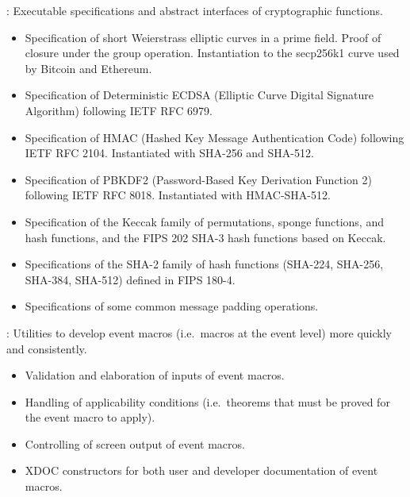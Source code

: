
\begin{frame}

\newlibtitle

:
Executable specifications and abstract interfaces of cryptographic functions.
\begin{itemize}
\item
Specification of short Weierstrass elliptic curves in a prime field.
Proof of closure under the group operation.
Instantiation to the secp256k1 curve used by Bitcoin and Ethereum.
\item
Specification of Deterministic ECDSA
(Elliptic Curve Digital Signature Algorithm)
following IETF RFC 6979.
\item
Specification of HMAC (Hashed Key Message Authentication Code)
following IETF RFC 2104.
Instantiated with SHA-256 and SHA-512.
\item
Specification of PBKDF2 (Password-Based Key Derivation Function 2)
following IETF RFC 8018.
Instantiated with HMAC-SHA-512.
\item
Specification of the Keccak family of permutations, sponge functions,
and hash functions, and the FIPS 202 SHA-3 hash functions based on Keccak.
\item
Specifications of the SHA-2 family of hash functions (SHA-224, SHA-256,
 SHA-384, SHA-512) defined in FIPS 180-4.
\item
Specifications of some common message padding operations.
\end{itemize}

\end{frame}


\begin{frame}

\newlibtitle

:
Utilities to develop event macros (i.e.\ macros at the event level)
more quickly and consistently.
\begin{itemize}
\item
Validation and elaboration of inputs of event macros.
\item
Handling of applicability conditions
(i.e.\ theorems that must be proved for the event macro to apply).
\item
Controlling of screen output of event macros.
\item
XDOC constructors for both user and developer documentation of event macros.
\end{itemize}

\end{frame}

